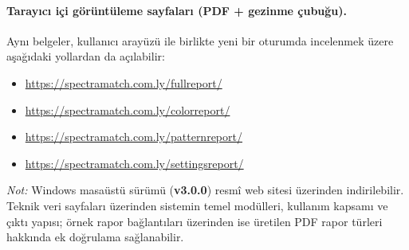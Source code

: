 \paragraph*{Tarayıcı içi görüntüleme sayfaları (PDF + gezinme çubuğu).}
Aynı belgeler, kullanıcı arayüzü ile birlikte yeni bir oturumda incelenmek üzere aşağıdaki yollardan da açılabilir:
\begin{itemize}
  \item \url{https://spectramatch.com.ly/fullreport/}
  \item \url{https://spectramatch.com.ly/colorreport/}
  \item \url{https://spectramatch.com.ly/patternreport/}
  \item \url{https://spectramatch.com.ly/settingsreport/}
\end{itemize}

\noindent\textit{Not:} Windows masaüstü sürümü (\textbf{v3.0.0}) resmî web sitesi üzerinden indirilebilir. Teknik veri sayfaları üzerinden sistemin temel modülleri, kullanım kapsamı ve çıktı yapısı; örnek rapor bağlantıları üzerinden ise üretilen PDF rapor türleri hakkında ek doğrulama sağlanabilir.

